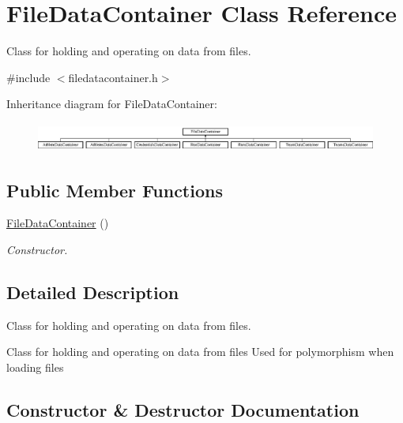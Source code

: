 \hypertarget{classFileDataContainer}{}\section{File\+Data\+Container Class Reference}
\label{classFileDataContainer}


Class for holding and operating on data from files.  




{\ttfamily \#include $<$filedatacontainer.\+h$>$}

Inheritance diagram for File\+Data\+Container\+:\begin{figure}[H]
\begin{center}
\leavevmode
\includegraphics[height=0.969697cm]{classFileDataContainer}
\end{center}
\end{figure}
\subsection*{Public Member Functions}
\begin{DoxyCompactItemize}
\item 
\mbox{\hyperlink{classFileDataContainer_ad93fac51b9510d74628ce82956a78d29}{File\+Data\+Container}} ()
\begin{DoxyCompactList}\small\item\em Constructor. \end{DoxyCompactList}\end{DoxyCompactItemize}


\subsection{Detailed Description}
Class for holding and operating on data from files. 

Class for holding and operating on data from files Used for polymorphism when loading files 

\subsection{Constructor \& Destructor Documentation}
\mbox{\label{classFileDataContainer_ad93fac51b9510d74628ce82956a78d29}} 
